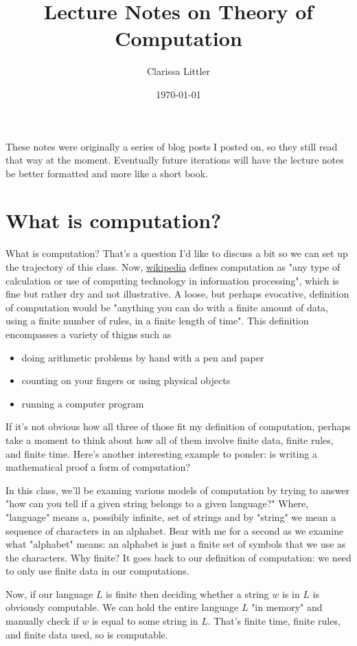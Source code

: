 \documentclass[11pt]{article}
\author{Clarissa Littler}
\date{\today}
\title{Lecture Notes on Theory of Computation}
\begin{document}
\maketitle

These notes were originally a series of blog posts I posted on, so they still read that way at the moment. Eventually future iterations will have the lecture notes be better formatted and more like a short book. 
\section{What is computation?}
\label{sec-1}
What is computation? That's a question I'd like to discuss a bit so we can set up the trajectory of this class. Now, \href{http://en.wikipedia.org/wiki/Computation}{wikipedia} defines computation as "any type of calculation or use of computing technology in information processing", which is fine but rather dry and not illustrative. A loose, but perhaps evocative, definition of computation would be "anything you can do with a finite amount of data, using a finite number of rules, in a finite length of time". This definition encompasses a variety of thigns such as 
\begin{itemize}
\item doing arithmetic problems by hand with a pen and paper
\item counting on your fingers or using physical objects
\item running a computer program
\end{itemize}
If it's not obvious how all three of those fit my definition of computation, perhaps take a moment to think about how all of them involve finite data, finite rules, and finite time. Here's another interesting example to ponder: is writing a mathematical proof a form of computation?

In this class, we'll be examing various models of computation by trying to answer "how can you tell if a given string belongs to a given language?" Where, "language" means a, possibily infinite, set of strings and by "string" we mean a sequence of characters in an alphabet. Bear with me for a second as we examine what "alphabet" means: an alphabet is just a finite set of symbols that we use as the characters. Why finite? It goes back to our definition of computation: we need to only use finite data in our computations.

Now, if our language $L$ is finite then deciding whether a string $w$ is in $L$ is obviously computable. We can hold the entire language $L$ "in memory" and manually check if $w$ is equal to some string in $L$. That's finite time, finite rules, and finite data used, so is computable.
\end{document}
